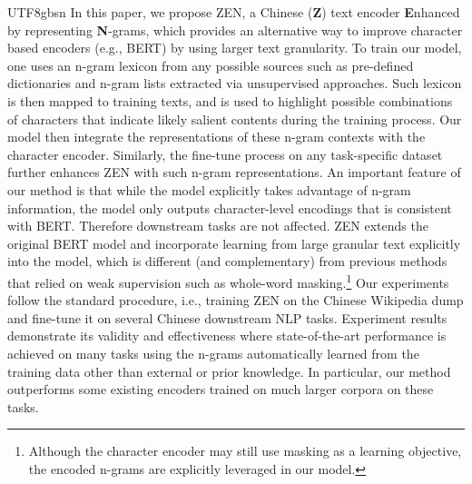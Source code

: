 \documentclass[11pt,a4paper]{article}
\begin{document}
\begin{CJK}{UTF8}{gbsn}
In this paper, we propose ZEN, a Chinese (\textbf{Z}) text encoder \textbf{E}nhanced by representing \textbf{N}-grams,
which provides an alternative way to improve character based encoders (e.g., BERT) by using larger text granularity.
To train our model, one uses an n-gram lexicon from any possible sources such as pre-defined dictionaries and n-gram lists extracted via unsupervised approaches.
Such lexicon is then mapped to training texts, and is used to highlight possible combinations of characters that indicate likely salient contents during the training process. Our model then integrate the representations of these n-gram contexts with the character encoder. 
Similarly, the fine-tune process on any task-specific dataset further enhances ZEN with such n-gram representations. An important feature of our method is that while the model explicitly takes advantage of n-gram information, the model only outputs character-level encodings that is consistent with BERT. Therefore downstream tasks are not affected.
ZEN extends the original BERT model and incorporate learning from large granular text explicitly into the model, which is different (and complementary) from previous methods that relied on weak supervision such as whole-word masking.\footnote{Although the character encoder may still use masking as a learning objective, the encoded n-grams are explicitly leveraged in our model.}
Our experiments follow the standard procedure, i.e., training ZEN on the Chinese Wikipedia dump and fine-tune it on several Chinese downstream NLP tasks.
Experiment results demonstrate its validity and effectiveness where state-of-the-art performance is achieved on many tasks using the n-grams automatically learned from the training data other than external or prior knowledge.
In particular, our method outperforms some existing encoders trained on much larger corpora on these tasks.






\end{CJK}
\end{document}
